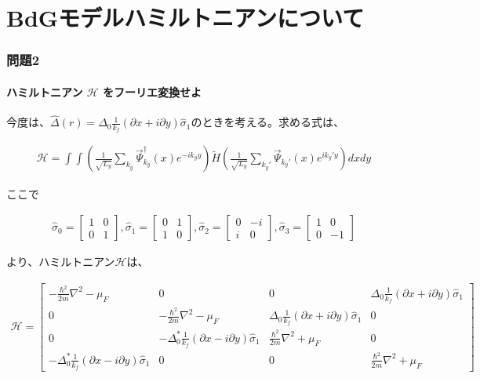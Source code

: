 \documentclass{jsarticle}
\begin{document}
\part{BdGモデルハミルトニアンについて}

	\section{問題2}
		\subsection{ハミルトニアン $\mathcal{H}$ をフーリエ変換せよ}
	今度は、$\hat{\Delta}(r)=\Delta_0\frac{1}{k_f} \left( \partial x+i\partial y \right)\hat{\sigma}_1$のときを考える。求める式は、

		\begin{align}
			\mathcal{H}=\int \int \left( \frac{1}{\sqrt{L_y}}\sum_{k_y} \vec{\Psi}^\dagger _{k_y}(x) e^{-ik_yy} \right) \tilde{H} \left( \frac{1}{\sqrt{L_y}}\sum_{k_y'} \vec{\Psi}_{k_y'}(x) e^{ik_y'y} \right) dxdy
			\label{hamil1}
		\end{align}

		ここで

		\begin{align}
			\hat{\sigma}_0=
			\begin{bmatrix}
				1 & 0 \\
				0 & 1
			\end{bmatrix},
			\hat{\sigma}_1=
			\begin{bmatrix}
				0 & 1 \\
				1 & 0
			\end{bmatrix},
			\hat{\sigma}_2=
			\begin{bmatrix}
				0 & -i \\
				i & 0
			\end{bmatrix} ,
			\hat{\sigma}_3=
			\begin{bmatrix}
				1 & 0 \\
				0 & -1
			\end{bmatrix}
		\end{align}

		より、ハミルトニアン$\mathcal{H}$は、

		\begin{align}
			\mathcal{H}=
			\begin{bmatrix}
				-\frac{\hbar^2}{2m}\nabla^2-\mu_F & 0 & 0 & \Delta_0\frac{1}{k_f} \left( \partial x+i\partial y \right)\hat{\sigma}_1 \\
				0 & -\frac{\hbar^2}{2m}\nabla^2-\mu_F & \Delta_0\frac{1}{k_f} \left( \partial x+i\partial y \right)\hat{\sigma}_1 & 0 \\
				0 & -\Delta_0^\ast\frac{1}{k_f} \left( \partial x-i\partial y \right)\hat{\sigma}_1 & \frac{\hbar^2}{2m}\nabla^2+\mu_F & 0 \\
				 -\Delta_0^\ast\frac{1}{k_f} \left( \partial x-i\partial y \right)\hat{\sigma}_1 & 0 & 0 & \frac{\hbar^2}{2m}\nabla^2+\mu_F
			\end{bmatrix}
		\end{align}
\end{document}
